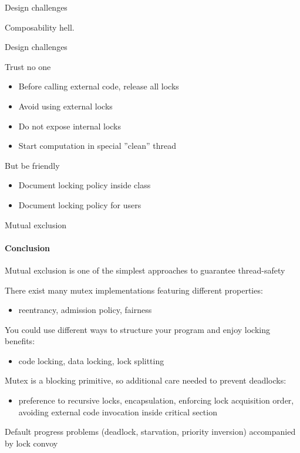 \begin{frame}[t]{Design challenges}

\tmpheader

\pause

Composability hell.

\end{frame}

\begin{frame}[t]{Design challenges}

\tmpheader

Trust no one
\begin{itemize}
    \item Before calling external code, release all locks
    \item Avoid using external locks
    \item Do not expose internal locks
    \item Start computation in special ''clean'' thread
\end{itemize}

\pause

But be friendly
\begin{itemize}
    \item Document locking policy inside class
    \item Document locking policy for users
\end{itemize}

\end{frame}


\begin{frame}{Mutual exclusion}
\framesubtitle{Conclusion}

Mutual exclusion is one of the simplest approaches to guarantee thread-safety

There exist many mutex implementations featuring different properties:
\begin{itemize}
    \item reentrancy, admission policy, fairness
\end{itemize} 

You could use different ways to structure your program and enjoy locking benefits:
\begin{itemize}
    \item code locking, data locking, lock splitting
\end{itemize} 

Mutex is a blocking primitive, so additional care needed to prevent deadlocks:
\begin{itemize}
    \item preference to recursive locks, encapsulation, enforcing lock acquisition order, avoiding external code invocation inside critical section
\end{itemize} 

Default progress problems (deadlock, starvation, priority inversion) accompanied by lock convoy
\end{frame}

